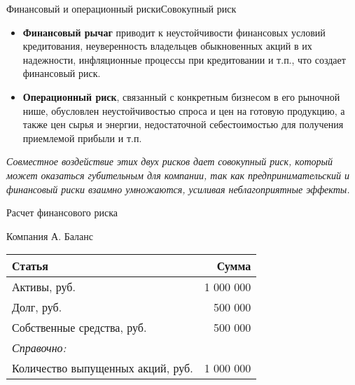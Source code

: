 \documentclass[financial_risks_lectures.tex]{subfiles}
\begin{document}
\begin{frame}[shrink=10]{Финансовый и операционный риски}{Совокупный риск}
\begin{itemize}
\item
\textbf{Финансовый рычаг} приводит к неустойчивости финансовых условий кредитования, неуверенность владельцев обыкновенных акций в их надежности, инфляционные процессы при кредитовании и т.п., что создает финансовый риск.
\item
\textbf{Операционный риск}, связанный с конкретным бизнесом в его рыночной нише, обусловлен неустойчивостью спроса и цен на готовую продукцию, а также цен сырья и энергии, недостаточной себестоимостью для получения приемлемой прибыли и т.п.
\end{itemize}
\textit{Совместное воздействие этих двух рисков дает совокупный риск, который может оказаться губительным для компании, так как предпринимательский и финансовый риски взаимно умножаются, усиливая неблагоприятные эффекты.
}
\end{frame}

\begin{frame}[shrink=10]{Расчет финансового риска}

\begin{exampleblock}{Компания А. Баланс}
\begin{table}[htbp]
  \centering
    \begin{tabular}{lr}
    \toprule
    Статья & Сумма \\
    \midrule
    Активы, руб. &       1 000 000    \\
    Долг, руб. &          500 000    \\
    Собственные средства, руб. &          500 000    \\
    \textit{Справочно:} &  \\
    Количество выпущенных акций, руб. &       1 000 000    \\
    \bottomrule
    \end{tabular}%
  \label{tab:addlabel}%
\end{table}

\end{exampleblock}

\end{frame}
\end{document}
